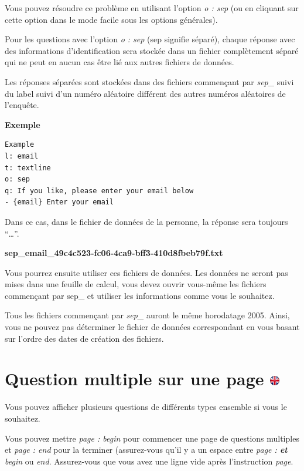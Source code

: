 \documentclass[
]{book}
\begin{document}
Vous pouvez résoudre ce problème en utilisant l'option \emph{o : sep} (ou en cliquant sur cette option dans le mode facile sous les options générales).

Pour les questions avec l'option \emph{o : sep} (sep signifie séparé), chaque réponse avec des informations d'identification sera stockée dans un fichier complètement séparé qui ne peut en aucun cas être lié aux autres fichiers de données.

Les réponses séparées sont stockées dans des fichiers commençant par \emph{sep\_} suivi du label suivi d'un numéro aléatoire différent des autres numéros aléatoires de l'enquête.

\textbf{Exemple}

\begin{verbatim}
Example
l: email
t: textline
o: sep
q: If you like, please enter your email below
- {email} Enter your email
\end{verbatim}

Dans ce cas, dans le fichier de données de la personne, la réponse sera toujours ``\ldots{}''.

\textbf{sep\_email\_49c4c523-fc06-4ca9-bff3-410d8fbeb79f.txt}

Vous pourrez ensuite utiliser ces fichiers de données. Les données ne seront pas mises dans une feuille de calcul, vous devez ouvrir vous-même les fichiers commençant par sep\_ et utiliser les informations comme vous le souhaitez.

Tous les fichiers commençant par \emph{sep\_} auront le même horodatage 2005. Ainsi, vous ne pouvez pas déterminer le fichier de données correspondant en vous basant sur l'ordre des dates de création des fichiers.

\hypertarget{question-multiple-sur-une-page}{%
\section[Question multiple sur une page ]{\texorpdfstring{Question multiple sur une page \href{https://www.psytoolkit.org/doc3.4.0/online-survey-syntax.html\#_multiple_question_on_one_page}{\protect\includegraphics{img/ukflag.png}}}{Question multiple sur une page }}\label{question-multiple-sur-une-page}}

Vous pouvez afficher plusieurs questions de différents types ensemble si vous le souhaitez.

Vous pouvez mettre \emph{page : begin} pour commencer une page de questions multiples et \emph{page : end} pour la terminer (assurez-vous qu'il y a un espace entre \emph{page :\textbf{ et }begin} ou \emph{end}. Assurez-vous que vous avez une ligne vide après l'instruction \emph{page}.
\end{document}
